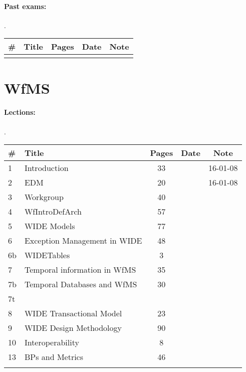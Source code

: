 \documentclass[a4paper,12pt]{article} %
\begin{document}
\paragraph{Past exams:}.\\
\begin{tabularx}{\textwidth}{|l|X|c|l|c|}
	\hline
	\# & Title & Pages & Date & Note \\
	\hline
	&  &  &  &  \\
	\hline
\end{tabularx}

\newpage
\section{WfMS}
\paragraph{Lections:}.\\
\begin{tabularx}{\textwidth}{|l|X|c|l|c|}
	\hline
	\# & Title & Pages & Date & Note \\
	\hline
	1 & Introduction & 33 &  & 16-01-08 \\
	\hline
	2 & EDM & 20 &  & 16-01-08 \\
	\hline
	3 & Workgroup & 40 &  &  \\
	\hline
	4 & WfIntroDefArch & 57 &  &  \\
	\hline
	5 & WIDE Models & 77 &  &  \\
	\hline
	6 & Exception Management in WIDE & 48 &  &  \\
	\hline
	6b & WIDETables & 3 &  &  \\
	\hline
	7 & Temporal information in WfMS & 35 &  &  \\
	\hline
	7b & Temporal Databases and WfMS & 30 &  &  \\
	\hline
	7t &  &  &  &  \\
	\hline
	8 & WIDE Transactional Model & 23 &  &  \\
	\hline
	9 & WIDE Design Methodology & 90 &  &  \\
	\hline
	10 & Interoperability & 8 &  &  \\
	\hline
	13 & BPs and Metrics & 46 &  &  \\
	\hline
	&  &  &  &  \\
	\hline
\end{tabularx}
\end{document}
